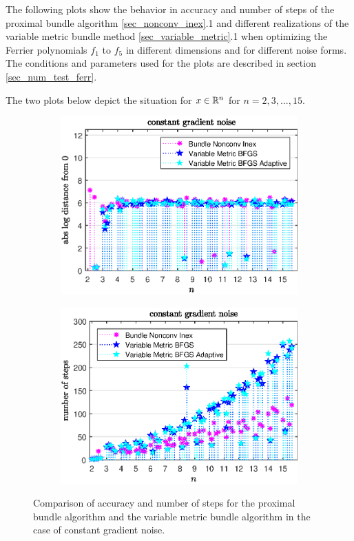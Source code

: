 The following plots show the behavior in accuracy and number of steps of the proximal bundle algorithm \ref{sec_nonconv_inex}.1 and different realizations of the variable metric bundle method \ref{sec_variable_metric}.1 when optimizing the Ferrier polynomials \(f_1\) to \(f_5\) in different dimensions and for different noise forms.
The conditions and parameters used for the plots are described in section \ref{sec_num_test_ferr}.

The two plots below depict the situation for \(x \in \mathbb{R}^n\) for \(n = 2,3,...,15\).

\begin{figure}[H]
	\begin{subfigure}{0.49\textwidth}
		\includegraphics[width=\textwidth]{Pictures/Plots/constant_gradient_noise.eps}%
	\end{subfigure}%
	\hfill
	\begin{subfigure}{0.49\textwidth}
		\includegraphics[width=\textwidth]{Pictures/Plots/steps_constant_gradient_noise.eps}%
	\end{subfigure}
	\caption[Accuracy and number of steps: constant gradient noise]{Comparison of accuracy and number of steps for the proximal bundle algorithm and the variable metric bundle algorithm in the case of constant gradient noise.}%
	\label{fig_const_grad_noise}%
\end{figure}

